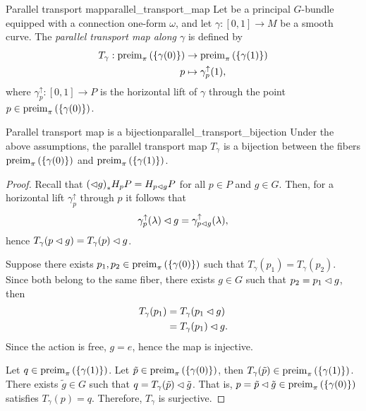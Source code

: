 \begin{definition}{Parallel transport map}{parallel_transport_map}
    Let  be a principal \(G\)-bundle equipped with a connection one-form \(\omega\), and let \(\gamma : [0,1] \to M\) be a smooth curve. The \emph{parallel transport map along \(\gamma\)} is defined by
    \begin{align*}
        T_{\gamma} : \operatorname{preim}_{\pi}{\left(\{\gamma(0)\}\right)} &\to \operatorname{preim}_{\pi}{\left(\{\gamma(1)\}\right)}\\
                                                p &\mapsto \gamma_p^\uparrow(1),
    \end{align*}
    where \(\gamma_p^\uparrow : [0,1] \to P\) is the horizontal lift of \(\gamma\) through the point \(p \in \operatorname{preim}_{\pi}{\left(\{\gamma(0)\}\right)}\).
\end{definition}

\begin{proposition}{Parallel transport map is a bijection}{parallel_transport_bijection}
    Under the above assumptions, the parallel transport map \(T_{\gamma}\) is a bijection between the fibers \(\operatorname{preim}_{\pi}{\left(\{\gamma(0)\}\right)}\) and  \(\operatorname{preim}_{\pi}{\left(\{\gamma(1)\}\right)}\).
\end{proposition}
\begin{proof}
    Recall that \({(\mathbin{\vartriangleleft} g)}_{\ast{}}H_pP = H_{p\mathbin{\vartriangleleft} g}P\) for all \(p \in P\) and \(g \in G\). Then,
    for a horizontal lift \(\gamma_p^\uparrow\) through \(p\) it follows that
    \begin{equation*}
        \gamma_p^\uparrow(\lambda) \mathbin{\vartriangleleft} g = \gamma_{p \mathbin{\vartriangleleft} g}^\uparrow(\lambda),
    \end{equation*}
    hence \(T_{\gamma} (p \mathbin{\vartriangleleft} g) = T_{\gamma}(p) \mathbin{\vartriangleleft} g\).

    Suppose there exists \(p_1, p_2 \in \operatorname{preim}_{\pi}{\left(\{\gamma(0)\}\right)}\) such that \(T_{\gamma}(p_1) = T_{\gamma}(p_2)\). Since both belong to the same fiber, there exists \(g \in G\) such that \(p_2 = p_1 \mathbin{\vartriangleleft} g\), then
    \begin{align*}
        T_{\gamma}(p_1) &= T_{\gamma}(p_1 \mathbin{\vartriangleleft} g)\\
                        &= T_{\gamma}(p_1) \mathbin{\vartriangleleft} g.
    \end{align*}
    Since the action is free, \(g = e\), hence the map is injective.

    Let \(q \in \operatorname{preim}_{\pi}{\left(\{\gamma(1)\}\right)}\). Let \(\tilde{p} \in \operatorname{preim}_{\pi}{\left(\{\gamma(0)\}\right)}\), then \(T_{\gamma}(\tilde{p}) \in \operatorname{preim}_{\pi}{\left(\{\gamma(1)\}\right)}\). There exists \(\tilde{g} \in G\) such that \(q = T_{\gamma}(\tilde{p}) \mathbin{\vartriangleleft} \tilde{g}\). That is, \(p = \tilde{p} \mathbin{\vartriangleleft} \tilde{g} \in \operatorname{preim}_{\pi}{\left(\{\gamma(0)\}\right)}\) satisfies \(T_{\gamma}(p) = q\). Therefore, \(T_{\gamma}\) is surjective.
\end{proof}

